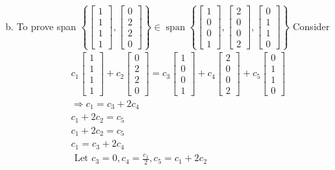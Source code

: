 \documentclass[11pt]{article}
\begin{document}
\begin{enumerate}[{\bf Q1.}]
\begin{enumerate}
		b. To prove span $\left\{\left[\begin{array}{l}1 \\ 1 \\ 1 \\ 1\end{array}\right],\left[\begin{array}{l}0 \\ 2 \\ 2 \\ 0\end{array}\right]\right\} \in \operatorname{span}\left\{\left[\begin{array}{l}1 \\ 0 \\ 0 \\ 1\end{array}\right],\left[\begin{array}{l}2 \\ 0 \\ 0 \\ 2\end{array}\right],\left[\begin{array}{l}0 \\ 1 \\ 1 \\ 0\end{array}\right]\right\}$ Consider
			$$
			\begin{aligned}
			c_1\left[\begin{array}{l}
			1 \\
			1 \\
			1 \\
			1
			\end{array}\right]+c_2\left[\begin{array}{l}
			0 \\
			2 \\
			2 \\
			0
			\end{array}\right]=c_3\left[\begin{array}{l}
			1 \\
			0 \\
			0 \\
			1
			\end{array}\right]+c_4\left[\begin{array}{l}
			2 \\
			0 \\
			0 \\
			2
			\end{array}\right]+c_5\left[\begin{array}{l}
			0 \\
			1 \\
			1 \\
			0
			\end{array}\right] \\
			\Rightarrow c_1=c_3+2 c_4 \\
			c_1+2 c_2=c_5 \\
			c_1+2 c_2=c_5 \\
			c_1=c_3+2 c_4 \\
			\text { Let } c_3=0, c_4=\frac{c_1}{2}, c_5=c_1+2 c_2
			\end{aligned}
			$$


\end{enumerate}
\end{enumerate}
\end{document}
